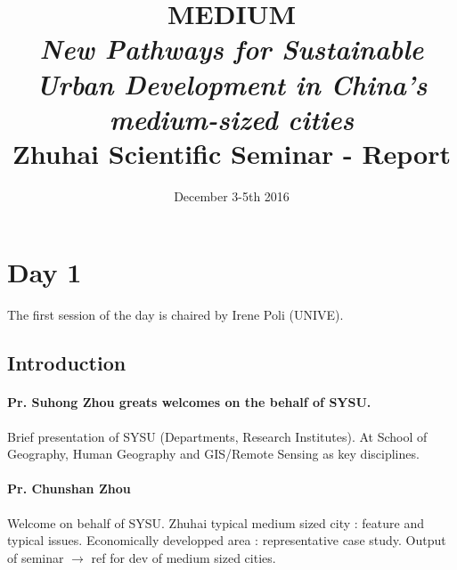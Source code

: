 




\title{MEDIUM\\\medskip
\textit{New Pathways for Sustainable Urban Development in China’s medium-sized cities}\\\medskip
Zhuhai Scientific Seminar - Report}
\author{}
\date{December 3-5th 2016}


\maketitle

\justify


\begin{abstract}
\end{abstract}






\section*{Day 1}

The first session of the day is chaired by Irene Poli (UNIVE).

\subsection*{Introduction}



\paragraph{Pr. Suhong Zhou greats welcomes on the behalf of SYSU.}

Brief presentation of SYSU (Departments, Research Institutes). At School of Geography, Human Geography and GIS/Remote Sensing as key disciplines.


\paragraph{Pr. Chunshan Zhou}

Welcome on behalf of SYSU.
Zhuhai typical medium sized city : feature and typical issues.
Economically developped area : representative case study.
Output of seminar $\rightarrow$ ref for dev of medium sized cities.

